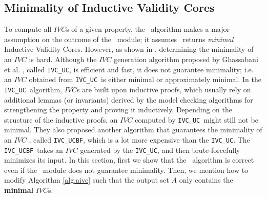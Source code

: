 \subsection{Minimality of Inductive Validity Cores}
\label{subsec:minimality}
\newcommand{\ucalg}{\texttt{\small{IVC\_UC}}}
\newcommand{\ucbfalg}{\texttt{\small{IVC\_UCBF}}}

To compute all $IVC$s of a given property, the \aivcalg ~algorithm
 makes a major assumption on the outcome of the \getivc ~module;
it assumes \getivc ~returns \emph{minimal} Inductive Validity Cores. 
However, as shown in \cite{Ghass16}, 
determining  the minimality of  an  $IVC$ is  hard. Although the $IVC$ generation algorithm proposed by Ghassabani et al. \cite{Ghass16}, called \ucalg ,
is efficient and fast, it does not guarantee minimality;
i.e. an $IVC$ obtained from \ucalg ~is either minimal or approximately minimal. 
In the \ucalg ~algorithm, $IVC$s are built upon inductive proofs, 
which usually rely on additional
lemmas (or invariants) derived by the model checking algorithms 
for strengthening the property and proving it
inductively. 
Depending on the structure of the inductive
proofs, an $IVC$ computed by \ucalg ~might still not be minimal. 
They also proposed another algorithm that guarantees 
the minimality of an $IVC$ \cite{Ghass16}, called \ucbfalg, which is a lot more expensive than the \ucalg. The \ucbfalg ~takes an $IVC$ generated by 
the \ucalg, and then brute-forcefully minimizes its input. In this section,
first we show that the \aivcalg ~algorithm is correct even if
 the \getivc ~module does not guarantee minimality.
Then, we mention how to modify Algorithm \ref{alg:aivc}
 such that the output set $A$ only contains the \textbf{minimal} $IVC$s. 


